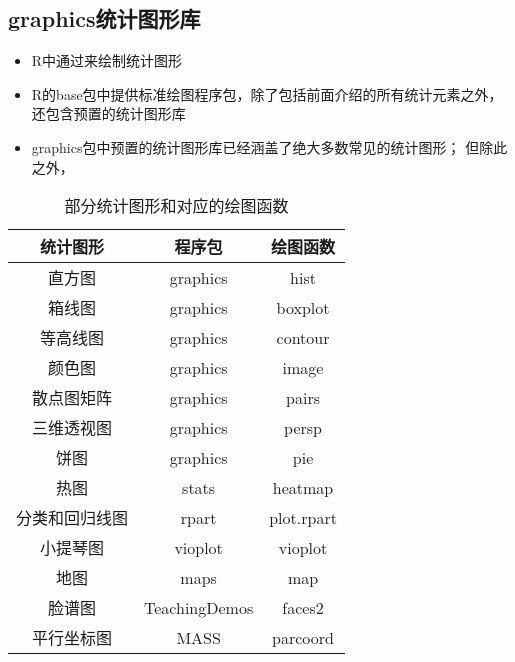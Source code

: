 \subsection{graphics统计图形库}
\begin{frame}[t]{\subsecname}{}
\begin{itemize}
\item R中通过来绘制统计图形
\item R的base包中提供标准绘图程序包，除了包括前面介绍的所有统计元素之外，
还包含预置的统计图形库
\item graphics包中预置的统计图形库已经涵盖了绝大多数常见的统计图形；
但除此之外，
\end{itemize}
\end{frame}

\begin{frame}{\subsecname}{}
\begin{table} \centering \footnotesize
  \begin{tabular}{|c|c|c|}
    \toprule
    \rowcolor{LightCyan}
    统计图形 & 程序包 & 绘图函数\\\hline
    直方图 & graphics & hist\\\hline
    箱线图 & graphics & boxplot\\\hline
    等高线图 & graphics & contour\\\hline
    颜色图 & graphics & image\\\hline
    散点图矩阵 & graphics & pairs \\\hline
    三维透视图 & graphics & persp\\\hline
    饼图 & graphics & pie \\\hline
    热图 & stats & heatmap\\\hline
    分类和回归线图 & rpart & plot.rpart\\\hline
    小提琴图 & vioplot & vioplot \\\hline
    地图 & maps & map\\\hline
    脸谱图 & TeachingDemos & faces2\\\hline
    平行坐标图 & MASS & parcoord \\
    \bottomrule
  \end{tabular}
  \caption{部分统计图形和对应的绘图函数}
\end{table}  
\end{frame}

